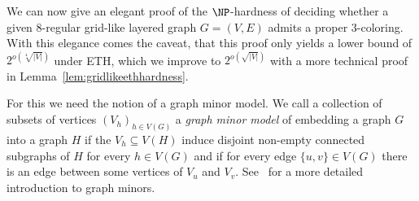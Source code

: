 We can now give an elegant proof of the $\NP$-hardness of deciding whether a given $8$-regular grid-like layered graph $G = (V, E)$ admits a proper $3$-coloring.
With this elegance comes the caveat, that this proof only yields a lower bound of $2^{o\left(\sqrt[4]{|V|}\right)}$ under ETH, which we improve to $2^{o\left(\sqrt{|V|}\right)}$ with a more technical proof in Lemma~\ref{lem:gridlikeethhardness}.

For this we need the notion of a graph minor model.
We call a collection of subsets of vertices $(V_h)_{h \in V(G)}$ a \emph{graph minor model} of embedding a graph $G$ into a graph $H$ if the $V_h \subseteq V(H)$ induce disjoint non-empty connected subgraphs of $H$ for every $h \in V(G)$ and if for every edge $\{u, v\} \in V(G)$ there is an edge between some vertices of $V_u$ and $V_v$.
See~\cite[Section 6.3]{cygan2015parameterized} for a more detailed introduction to graph minors.

